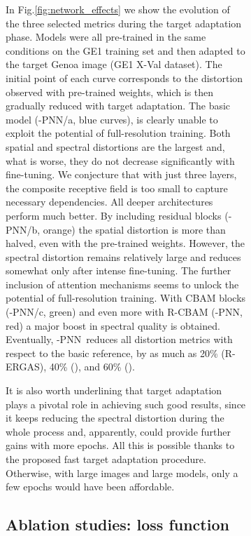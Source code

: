 \documentclass[journal]{IEEEtran}
\newcommand{\LPNN}  {-PNN}
\begin{document}
\begin{figure}
\begin{figure}
In Fig.\ref{fig:network_effects} we show the evolution of the three selected metrics during the target adaptation phase.
Models were all pre-trained in the same conditions on the GE1 training set and then adapted to the target Genoa image (GE1 X-Val dataset).
The initial point of each curve corresponds to the distortion observed with pre-trained weights,
which is then gradually reduced with target adaptation.
The basic model (\LPNN/a, blue curves), is clearly unable to exploit the potential of full-resolution training.
Both spatial and spectral distortions are the largest and, what is worse, they do not decrease significantly with fine-tuning.
We conjecture that with just three layers, the composite receptive field is too small to capture necessary dependencies.
All deeper architectures perform much better.
By including residual blocks (\LPNN/b, orange) the spatial distortion  is more than halved, even with the pre-trained weights.
However, the spectral distortion remains relatively large and reduces somewhat only after intense fine-tuning.
The further inclusion of attention mechanisms seems to unlock the potential of full-resolution training.
With CBAM blocks (\LPNN/c, green) and even more with R-CBAM (\LPNN, red) a major boost in spectral quality is obtained.
Eventually,
\LPNN\ reduces all distortion metrics with respect to the basic reference, by as much as 20\% (R-ERGAS), 40\% (), and 60\% ().

It is also worth underlining that target adaptation plays a pivotal role in achieving such good results,
since it keeps reducing the spectral distortion during the whole process and, apparently, could provide further gains with more epochs.
All this is possible thanks to the proposed fast target adaptation procedure.
Otherwise, with large images and large models, only a few epochs would have been affordable.

\subsection{Ablation studies: loss function}


\end{figure}
\end{figure}
\end{document}
